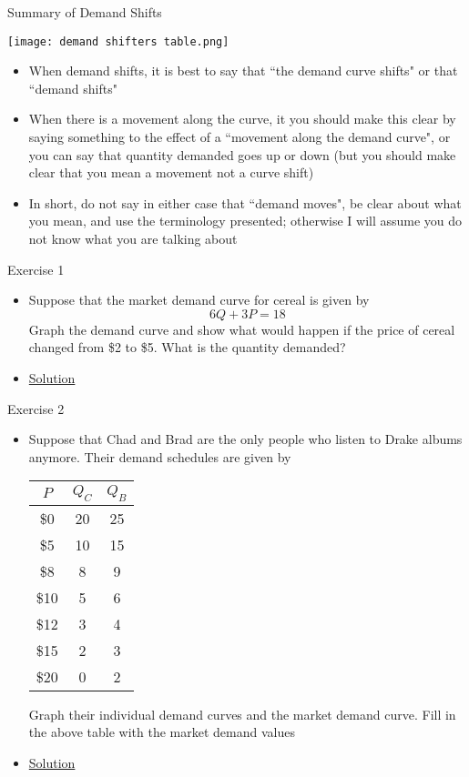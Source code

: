 \documentclass[10pt,xcolor={svgnames}]{beamer}
\begin{document}
\begin{frame}{Summary of Demand Shifts}
    \begin{center}
        \texttt{[image: demand shifters table.png]}
    \end{center}
    \begin{itemize}
        \item When demand shifts, it is best to say that ``the demand curve shifts" or that ``demand shifts"
        \item When there is a movement along the curve, it you should make this clear by saying something to the effect of a ``movement along the demand curve", or you can say that quantity demanded goes up or down (but you should make clear that you mean a movement not a curve shift)
        \item In short, do not say in either case that ``demand moves", be clear about what you mean, and use the terminology presented; otherwise I will assume you do not know what you are talking about
    \end{itemize}
\end{frame}

\begin{frame}{Exercise 1}
    \begin{itemize}[<+->]
        \item Suppose that the market demand curve for cereal is given by
        $$6Q+3P=18$$
        Graph the demand curve and show what would happen if the price of cereal changed from \$2 to \$5. What is the quantity demanded?
        \item \hyperlink{Sol1}{\alert{Solution}}
    \end{itemize}
\end{frame}


\begin{frame}{Exercise 2}
    \begin{itemize}[<+->]
        \item Suppose that Chad and Brad are the only people who listen to Drake albums anymore. Their demand schedules are given by
        \begin{table}[H]
            \centering
            \begin{tabular}{c|c|c}
                $P$ & $Q_{C}$ & $Q_{B}$ \\
                \hline
                \$0 & 20 & 25\\
                \$5 & 10 & 15\\
                \$8 & 8 & 9\\
                \$10 & 5 & 6\\
                \$12 & 3 & 4\\
                \$15 & 2 & 3\\
                \$20 & 0 & 2
            \end{tabular}
        \end{table}
        Graph their individual demand curves and the market demand curve. Fill in the above table with the market demand values
        \item \hyperlink{Sol2}{\alert{Solution}}
    \end{itemize}
\end{frame}
\end{document}
